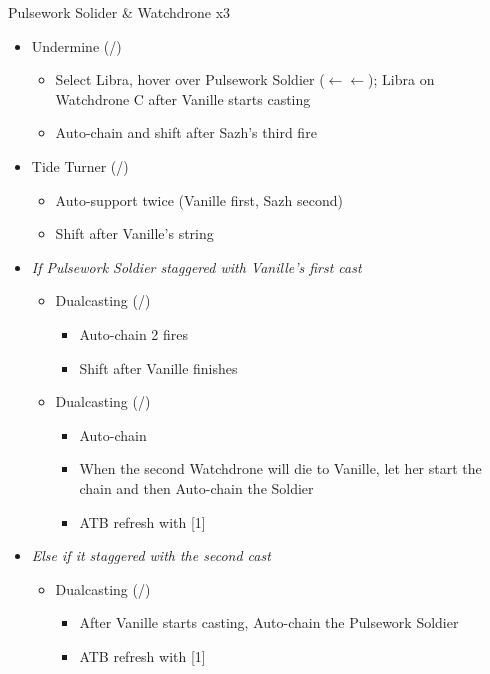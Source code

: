 \renewcommand{\first}{[1] Dualcasting (\rav/\rav)}
\renewcommand{\second}{[2] Tide Turner (\syn/\sab)}
\renewcommand{\third}{[3] Yin \& Yang (\rav/\med)}
\renewcommand{\fourth}{[4] Undermine (\rav/\sab)}
\renewcommand{\fifth}{[5] Dualcasting (\rav/\rav)}
\begin{battle}{Pulsework Solider \& Watchdrone x3}
\begin{itemize}
    \item \fourth
    \begin{itemize}
        \item Select Libra, hover over Pulsework Soldier ($\leftarrow\leftarrow$); Libra on Watchdrone C after Vanille starts casting
        \item Auto-chain and shift after Sazh's third fire
    \end{itemize}
    \item \second
    \begin{itemize}
        \item Auto-support twice (Vanille first, Sazh second)
        \item Shift after Vanille's string
    \end{itemize}
    \item \textit{If Pulsework Soldier staggered with Vanille's first cast}
    \begin{itemize}
        \item \first
        \begin{itemize}
            \item Auto-chain 2 fires
            \item Shift after Vanille finishes
        \end{itemize}
        \item \fifth
        \begin{itemize}
            \item Auto-chain
            \item When the second Watchdrone will die to Vanille, let her start the chain and then Auto-chain the Soldier
            \item ATB refresh with [1]
        \end{itemize}
    \end{itemize}
    \item \textit{Else if it staggered with the second cast}
    \begin{itemize}
        \item \first
        \begin{itemize}
            \item After Vanille starts casting, Auto-chain the Pulsework Soldier
            \item ATB refresh with [1]
        \end{itemize}
    \end{itemize}
\end{itemize}
\end{battle}
\renewcommand{\first}{[1] Tri-disaster (\rav/\rav/\rav)}
\renewcommand{\fourth}{[4] Variety (\rav/\sab/\med)}

